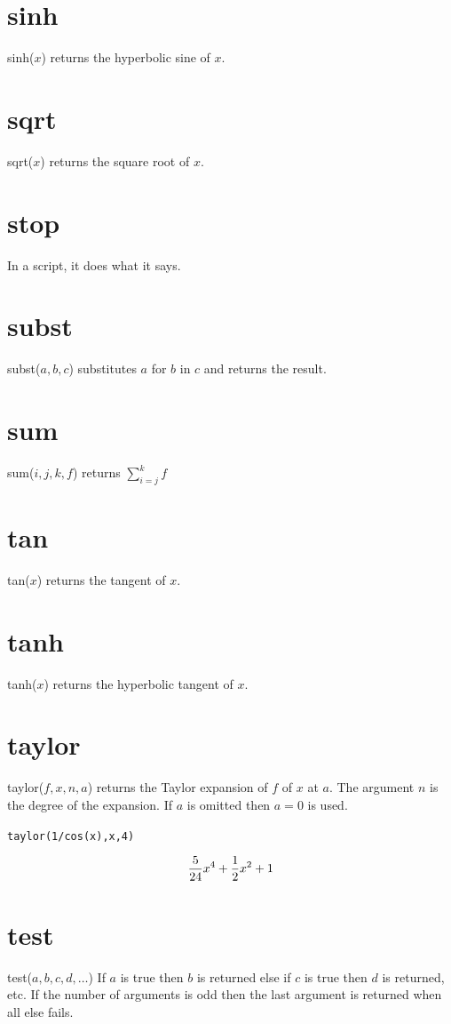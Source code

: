 \documentclass[12pt]{book}
\begin{document}
\section*{sinh}
sinh($x$) returns the hyperbolic sine of $x$.

\section*{sqrt}
sqrt($x$) returns the square root of $x$.

\section*{stop}
In a script, it does what it says.

\section*{subst}
subst($a,b,c$) substitutes $a$ for $b$ in $c$ and returns the result.

\section*{sum}
sum($i,j,k,f$) returns $\displaystyle\sum_{i=j}^k f$

\section*{tan}
tan($x$) returns the tangent of $x$.

\section*{tanh}
tanh($x$) returns the hyperbolic tangent of $x$.

\section*{taylor}
taylor($f,x,n,a$) returns the Taylor expansion of $f$ of $x$ at $a$.
The argument $n$ is the degree of the expansion.
If $a$ is omitted then $a=0$ is used.

\medskip
{\tt taylor(1/cos(x),x,4)}

$${5\over24}x^4+{1\over2}x^2+1$$

\section*{test}
test($a,b,c,d,\ldots$)
If $a$ is true then $b$ is returned else if $c$ is true then $d$ is returned, etc.
If the number of arguments is odd then the last argument is returned when all else fails.
\end{document}
